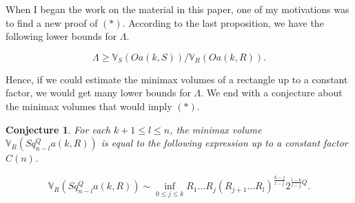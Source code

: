 \documentclass{amsart}
\newtheorem*{Theorem 1}{Theorem 1}
\newtheorem*{Theorem 2}{Theorem 2}
\newtheorem*{Theorem 1A}{Theorem 1A}
\newtheorem*{Theorem 2A}{Theorem 2A}
\newtheorem*{conj}{Conjecture}
\newtheorem*{vanishing lemma}{Vanishing Lemma}
\numberwithin{equation}{section}
\begin{document}
When I began the work on the material in this paper, 
one of my motivations was to find a new proof of $(*)$.  
According to the last proposition, we have the following lower bounds for $\Lambda$.

$$\Lambda \ge \mathbb{V}_S(O a(k,S)) / \mathbb{V}_R(O a(k,R)).$$

Hence, if we could estimate the minimax volumes of a rectangle up to a constant factor, we would get many lower bounds for $\Lambda$.  We end with a conjecture about the minimax volumes that would imply $(*)$.

\begin{conj} For each $k+1 \le l \le n$, the minimax volume $\mathbb{V}_R(Sq_{n-l}^Q a(k,R))$ is equal to the
following expression up to a constant factor $C(n)$.

$$\mathbb{V}_R(Sq_{n-l}^Q a(k,R)) \sim \inf_{0 \le j \le k} R_1... R_j (R_{j+1} ... R_l)^{\frac{k-j}{l-j}} 2^{\frac{l-k}{l-j} Q}.$$

\end{conj}
\end{document}
